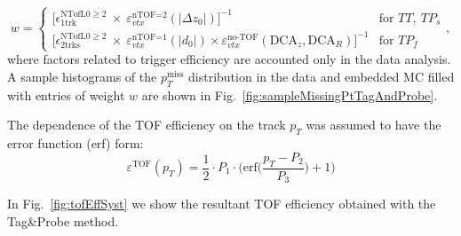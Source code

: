 \begin{equation}\label{eq:tagAndProbeWeight}%
w=\left\{
\begin{array}{ll}
\Big[\epsilon^{\text{NTofL0}\geq2}_{1\text{trk}}~\times~\varepsilon_{vtx}^{\text{nTOF=2}}(|\Delta z_{0}|)\Big]^{-1} & \textrm{for~}TT,~TP_{s}\\[3pt]
\Big[\epsilon^{\text{NTofL0}\geq2}_{2\text{trks}}~\times~\varepsilon_{vtx}^{\text{nTOF=1}}(|d_{0}|)\times \varepsilon_{vtx}^{\text{no-TOF}}(\text{DCA}_{z},\text{DCA}_{R})\Big]^{-1} & \textrm{for~}TP_{f}
\end{array}
\right.,
\end{equation}
where factors related to trigger efficiency are accounted only in the data analysis. A sample histograms of the $p_{T}^{\text{miss}}$ distribution in the data and embedded MC filled with entries of weight $w$ are shown in Fig.~\ref{fig:sampleMissingPtTagAndProbe}.

The dependence of the TOF efficiency on the track $p_{T}$ was assumed to have the error function (erf) form:
\begin{equation}\label{eq:tofEffFunc}
 \varepsilon^{\text{TOF}}(p_{T}) = \frac{1}{2} \cdot P_{1}\cdot  \Big(\text{erf}\Big(\frac{p_{T}-P_{2}}{P_{3}}\Big) + 1\Big)
\end{equation}

In Fig.~\ref{fig:tofEffSyst} we show the resultant TOF efficiency obtained with the Tag\&Probe method.

